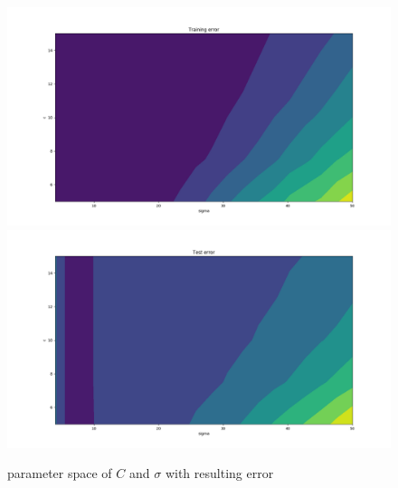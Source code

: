 \begin{figure}[h]
\begin{center}
\centering
\includegraphics[width=1\textwidth]{figures/new/3_Figure_6}
\includegraphics[width=1\textwidth]{figures/new/3_Figure_5}
\end{center}
\caption{\label{fig:3_4}  parameter space of $C$ and $\sigma$  with resulting error  }
\end{figure}





